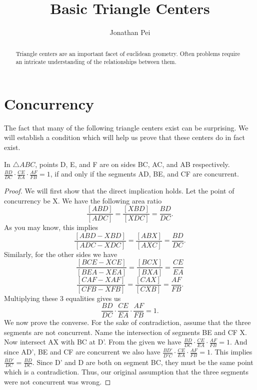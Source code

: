 \documentclass[11pt]{scrartcl}
\theoremstyle{plain}
\begin{document}
\title{Basic Triangle Centers}
\author{Jonathan Pei}
\subtitle{}
\maketitle

\begin{abstract}
    Triangle centers are an important facet of euclidean geometry.
    Often problems require an intricate understanding of the relationships between them.
\end{abstract}
\newpage
\tableofcontents
\newpage
\section{Concurrency}
    The fact that many of the following triangle centers exist can be surprising. We will establish a condition which will help us prove that these centers do in fact exist.
        \begin{theorem}[Ceva's] 
            In $\triangle ABC$, points D, E, and F are on sides BC, AC, and AB respectively. $\frac{BD}{DC}\cdot \frac{CE}{EA}\cdot\frac{AF}{FB} = 1$, if and only if the segments AD, BE, and CF are concurrent.
            
        \end{theorem}
        
    \begin{proof}
        We will first show that the direct implication holds. Let the point of concurrency be X. We have the following area ratio 
        $$\frac{[ABD]}{[ADC]} = \frac{[XBD]}{[XDC]}=\frac{BD}{DC}.$$
        As you may know, this implies $$\frac{[ABD-XBD]}{[ADC-XDC]}=\frac{[ABX]}{[AXC]}=\frac{BD}{DC}.$$
        Similarly, for the other sides we have 
        $$\frac{[BCE-XCE]}{[BEA-XEA]}=\frac{[BCX]}{[BXA]}=\frac{CE}{EA}$$
        $$\frac{[CAF-XAF]}{[CFB-XFB]}=\frac{[CAX]}{[CXB]}=\frac{AF}{FB}.$$
        Multiplying these 3 equalities gives us 
        $$\frac{BD}{DC}\cdot \frac{CE}{EA}\cdot\frac{AF}{FB} = 1.$$
        We now prove the converse. For the sake of contradiction, assume that the three segments are not concurrent.
        Name the intersection of segments BE and CF X. Now intersect AX with BC at D'. From the given we have $\frac{BD}{DC}\cdot \frac{CE}{EA}\cdot\frac{AF}{FB} = 1.$
        And since AD', BE and CF are concurrent we also have $\frac{BD'}{D'C}\cdot \frac{CE}{EA}\cdot\frac{AF}{FB} = 1.$
        This implies $\frac{BD'}{DC}=\frac{BD}{DC}$. Since D' and D are both on segment BC, they must be the same point which is a contradiction. Thus, our original assumption 
        that the three segments were not concurrent was wrong.
    \end{proof} 
 
\end{document}
